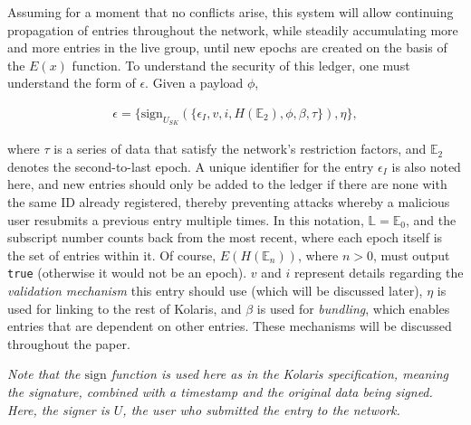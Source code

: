 \documentclass{extreport}
\begin{document}
Assuming for a moment that no conflicts arise, this system will allow continuing propagation of entries throughout the network, while steadily accumulating more and more entries in the live group, until new epochs are created on the basis of the \(E(x)\) function. To understand the security of this ledger, one must understand the form of \(\epsilon\). Given a payload \(\phi\),

\begin{align*}
\epsilon = \{ \mathrm{sign}_{U_{SK}}( \{ \epsilon_I, v, i, H(\mathbb{E}_2), \phi, \beta, \tau \} ), \eta \}, \tag{3.3}
\end{align*}

where \(\tau\) is a series of data that satisfy the network's restriction factors, and \(\mathbb{E}_2\) denotes the second-to-last epoch. A unique identifier for the entry \(\epsilon_I\) is also noted here, and new entries should only be added to the ledger if there are none with the same ID already registered, thereby preventing attacks whereby a malicious user resubmits a previous entry multiple times. In this notation, \(\mathbb{L} = \mathbb{E}_0\), and the subscript number counts back from the most recent, where each epoch itself is the set of entries within it. Of course, \(E(H(\mathbb{E}_n))\), where \(n > 0\), must output \texttt{true} (otherwise it would not be an epoch). \(v\) and \(i\) represent details regarding the \emph{validation mechanism} this entry should use (which will be discussed later), \(\eta\) is used for linking to the rest of Kolaris, and \(\beta\) is used for \emph{bundling}, which enables entries that are dependent on other entries. These mechanisms will be discussed throughout the paper.

\emph{Note that the \(\mathrm{sign}\) function is used here as in the Kolaris specification, meaning the signature, combined with a timestamp and the original data being signed. Here, the signer is \(U\), the user who submitted the entry to the network.}
\end{document}
